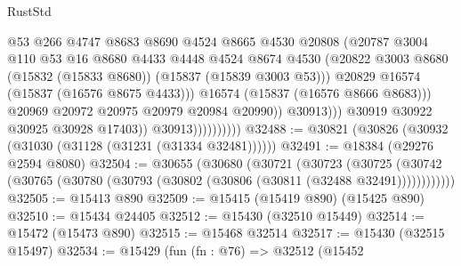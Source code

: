 \begin{lexlean}{RustStd}
\begin{coremodule}
                                        @53
                                        @266
                                        @4747
                                        @8683
                                        @8690
                                        @4524
                                        @8665
                                        @4530
                                        @20808
                                        (@20787
                                          @3004
                                          @110
                                          @53
                                          @16
                                          @8680
                                          @4433
                                          @4448
                                          @4524
                                          @8674
                                          @4530
                                          (@20822
                                            @3003
                                            @8680
                                            (@15832 (@15833 @8680))
                                            (@15837 (@15839 @3003 @53)))
                                          @20829
                                          @16574
                                          (@15837 (@16576 @8675 @4433)))
                                        @16574
                                        (@15837 (@16576 @8666 @8683)))
                                      @20969
                                      @20972
                                      @20975
                                      @20979
                                      @20984
                                      @20990))
                                  @30913)))
                            @30919
                            @30922
                            @30925
                            @30928
                            @17403))
                        @30913))))))))))
@32488 := @30821 (@30826 (@30932 (@31030 (@31128 (@31231 (@31334 @32481))))))
@32491 := @18384 (@29276 @2594 @8080)
@32504 := @30655
    (@30680
      (@30721
        (@30723
          (@30725 (@30742 (@30765 (@30780 (@30793 (@30802 (@30806 (@30811 (@32488 @32491))))))))))))
@32505 := @15413 @890
@32509 := @15415 (@15419 @890) (@15425 @890)
@32510 := @15434 @24405
@32512 := @15430 (@32510 @15449)
@32514 := @15472 (@15473 @890)
@32515 := @15468 @32514
@32517 := @15430 (@32515 @15497)
@32534 := @15429
    (fun (fn : @76) =>
    @32512
      (@15452

\end{coremodule}
\end{lexlean}
